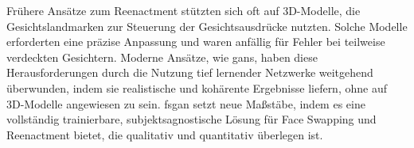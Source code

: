 Frühere Ansätze zum Reenactment stützten sich oft auf 3D-Modelle, die Gesichtslandmarken zur Steuerung der Gesichtsausdrücke nutzten.
Solche Modelle erforderten eine präzise Anpassung und waren anfällig für Fehler bei teilweise verdeckten Gesichtern.
Moderne Ansätze, wie \glspl{gan}, haben diese Herausforderungen durch die Nutzung tief lernender Netzwerke weitgehend überwunden, indem sie realistische und kohärente Ergebnisse liefern, ohne auf 3D-Modelle angewiesen zu sein.
\gls{fsgan} setzt neue Maßstäbe, indem es eine vollständig trainierbare, subjektsagnostische Lösung für Face Swapping und Reenactment bietet, die qualitativ und quantitativ überlegen ist\cite{face-swapping-and-reenactment}.